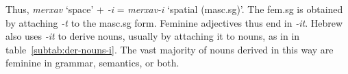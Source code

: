 \begin{table}[ht]
\end{table}
Thus, \textit{merxav} `space' + \textit{-i} = \textit{merxav-i} 
`spatial (masc.sg)'. The fem.sg is obtained by attaching \textit{-t} to the masc.sg
form. Feminine adjectives thus end in \textit{-it}. 
Hebrew also uses \textit{-it} to derive nouns, usually by attaching it 
to nouns, as in in table~\ref{subtab:der-nouns-i}. 
The vast majority of nouns derived in this way are feminine in 
grammar, semantics, or both. 



